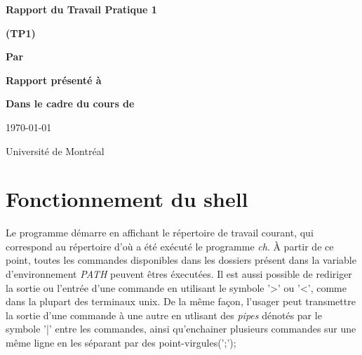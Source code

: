 \documentclass[letterpaper,12pt]{scrartcl}
\begin{document}
	\begin{center}
		\vspace{2cm}

		{\Huge\bf\sf Rapport du Travail Pratique 1}

		\vspace{0.5cm}

		{\bf\sf (TP1)}

		\vspace{4cm}

		{\bf\sf Par}

		\vspace{0.5cm}{\large\bf\sf Charles Langlois et François Poitras}

		\vspace{2cm}

		{\bf\sf Rapport présenté à}

		\vspace{0.5cm}{\large\bf\sf M. Stefan Monnier}

		\vspace{2cm}

		{\bf\sf Dans le cadre du cours de}

		\vspace{0.5cm}{\large\bf\sf Systèmes d'exploitation (IFT2245)}

		\vspace{\fill}
		\today

		\vspace{0.5cm}Université de Montréal
	\end{center}
	
	\newpage

	\pagestyle{cb}
	
	\tableofcontents

	\newpage

	\section{Fonctionnement du shell}
			Le programme démarre en affichant le répertoire de travail courant, qui correspond au répertoire d'où a été exécuté le programme \textit{ch}. À partir de ce point, toutes les commandes disponibles dans les dossiers présent dans la variable d'environnement \textit{PATH} peuvent êtres éxecutées. Il est aussi possible de rediriger la sortie ou l'entrée d'une commande en utilisant le symbole '>' ou '<', comme dans la plupart des terminaux unix. De la même façon, l'usager peut transmettre la sortie d'une commande à une autre en utlisant des \textit{pipes} dénotés par le symbole '|' entre les commandes, ainsi qu'enchainer plusieurs commandes sur une même ligne en les séparant par des point-virgules(';'); 
\end{document}
